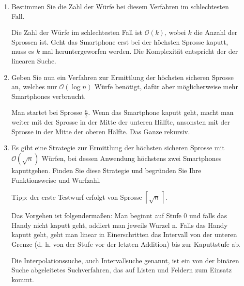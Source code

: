 \documentclass{lehramt-informatik-aufgabe}
\begin{document}
\begin{enumerate}


\item Bestimmen Sie die Zahl der Würfe bei diesem Verfahren im
schlechtesten Fall.

\begin{liAntwort}
Die Zahl der Würfe im schlechtesten Fall ist $\mathcal{O} (k)$, wobei $k$
die Anzahl der Sprossen ist. Geht das Smartphone erst bei der höchsten
Sprosse kaputt, muss es $k$ mal heruntergeworfen werden. Die Komplexität
entspricht der der linearen Suche.
\end{liAntwort}


\item Geben Sie nun ein Verfahren zur Ermittlung der höchsten sicheren
Sprosse an, welches nur $\mathcal{O} (\log n)$ Würfe benötigt, dafür
aber möglicherweise mehr Smartphones verbraucht.

\begin{liAntwort}
Man startet bei Sprosse $\frac{n}{2}$. Wenn das Smartphone kaputt geht,
macht man weiter mit der Sprosse in der Mitte der unteren Hälfte,
ansonsten mit der Sprosse in der Mitte der oberen Hälfte. Das Ganze
rekursiv.
\end{liAntwort}


\item Es gibt eine Strategie zur Ermittlung der höchsten sicheren
Sprosse mit $\mathcal{O}\left(\sqrt{n}\right)$ Würfen, bei dessen Anwendung
höchstens zwei Smartphones kaputtgehen. Finden Sie diese Strategie und
begründen Sie Ihre Funktionsweise und Wurfzahl.

Tipp: der erste Testwurf erfolgt von Sprosse $\left\lceil\sqrt{n}\,\right\rceil$.

\begin{liAntwort}
Das Vorgehen ist folgendermaßen: Man beginnt auf Stufe 0 und falls das
Handy nicht kaputt geht, addiert man jeweils Wurzel n. Falls das Handy
kaputt geht, geht man linear in Einerschritten das Intervall von der
unteren Grenze (d. h. von der Stufe vor der letzten Addition) bis zur
Kaputtstufe ab.

\begin{liExkurs}[Interpolationssuche]
Die Interpolationssuche, auch Intervallsuche genannt, ist ein von der
binären Suche abgeleitetes Suchverfahren, das auf Listen und Feldern zum
Einsatz kommt.


\end{liExkurs}
\end{liAntwort}
\end{enumerate}
\end{document}
